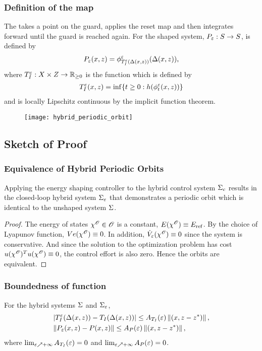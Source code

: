 \begin{frame}
  \frametitle{Definition of the \Poincare{} map}
   {
    The  takes a point on the guard, applies
    the reset map and then integrates forward until the guard is reached
    again. For the shaped system, $P_{\varepsilon} : S \to S$, is defined by
    \begin{align*}
      P_{\varepsilon}(x, z) = \phi^{\varepsilon}_{T_{I}^{\varepsilon}(\Delta(x, z))}(\Delta(x, z)),
    \end{align*}
    where $T_{I}^{\varepsilon} : X \times Z \to \mathbb{R}_{\geq 0}$ is the \tti{} function which is
    defined by
    \begin{align*}
      T_{I}^{\varepsilon}(x, z) = \inf \{ t \geq 0 : h(\phi^{\varepsilon}_{t}(x, z)) \}
    \end{align*}
    and is locally Lipschitz continuous by the implicit function theorem.
  }

   {
    \begin{figure}
      \centering
      \texttt{[image: hybrid\_periodic\_orbit]}
    \end{figure}
  }
\end{frame}

\subsection{Sketch of Proof}

\begin{frame}
  \frametitle{Equivalence of Hybrid Periodic Orbits}
  \begin{theorem}
    Applying the energy shaping controller to the hybrid control system $\Sigma_{c}$
    results in the closed-loop hybrid system $\Sigma_{\varepsilon}$ that demonstrates a
    periodic orbit which is identical to the unshaped system $\Sigma$.
  \end{theorem}
  \begin{proof}
    The energy of states $\chi^{\mathscr O} \in \mathscr O$ is a constant,
    $E(\chi^{\mathscr O}) \equiv E_{\mathrm{ref}}$. By the choice of Lyapunov function,
    $Ve(\chi^{\mathscr O}) \equiv 0$. In addition, ${\dot V}_{\varepsilon}(\chi^{\mathscr O}) \equiv 0$ since
    the system is conservative. And since the solution to the optimization
    problem has cost $u(\chi^{\mathscr O})^{T} u(\chi^{\mathscr O}) \equiv 0$, the
    control effort is also zero. Hence the orbits are equivalent.
    \end{proof}
\end{frame}

\begin{frame}
  \frametitle{Boundedness of \TtI{} function}
  \begin{lemma}
    For the hybrid systems $\Sigma$ and $\Sigma_{\varepsilon}$,
    \begin{eqnarray}
      \nonumber
      &| T_{I}^{\varepsilon}(\Delta(x, z)) - T_{I}(\Delta(x, z)) | \leq A_{T_{I}}(\varepsilon) \left\|(x, z - z^{*})\right\|,\\
      &\| P_{\varepsilon}(x, z) - P(x, z) \| \leq A_{P}(\varepsilon) \left\|(x, z - z^{*})\right\|,
    \end{eqnarray}
    where $\lim_{\varepsilon \nearrow +\infty} A_{T_{I}}(\varepsilon) = 0$ and $\lim_{\varepsilon \nearrow +\infty}A_{P}(\varepsilon) = 0$.
  \end{lemma}
\end{frame}

